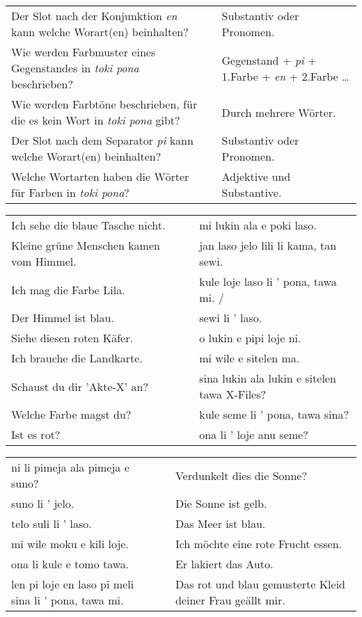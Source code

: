 \begin{supertabular}{p{5,5cm}|ll}
Der Slot nach der Konjunktion \textit{en} kann welche Worart(en) beinhalten? && Substantiv oder Pronomen.  \\ %
Wie werden Farbmuster eines Gegenstandes in \textit{toki pona} beschrieben? && Gegenstand + \textit{pi} + 1.Farbe + \textit{en} + 2.Farbe \dots \\ %
Wie werden Farbtöne beschrieben, für die es kein Wort in \textit{toki pona} gibt? && Durch mehrere Wörter. \\ %
Der Slot nach dem Separator \textit{pi} kann welche Worart(en) beinhalten? && Substantiv oder Pronomen.  \\ %
Welche Wortarten haben die Wörter für Farben in \textit{toki pona}? && Adjektive und Substantive. \\ %
\end{supertabular}

\begin{supertabular}{p{5,5cm}|ll}
Ich sehe die blaue Tasche nicht.  && mi lukin ala e poki laso. \\ %
Kleine grüne Menschen kamen vom Himmel.  && jan laso jelo lili li kama, tan sewi.  \\ %
Ich mag die Farbe Lila.  && kule loje laso li ' pona, tawa mi. / \\ %
Der Himmel ist blau.  && sewi li ' laso. \\ %
Siehe diesen roten Käfer.  && o lukin e pipi loje ni.  \\ %
Ich brauche die Landkarte.  && mi wile e sitelen ma. \\ %
Schaust du dir 'Akte-X' an?   && sina lukin ala lukin e sitelen tawa X-Files? \\ %
Welche Farbe magst du?  && kule seme li ' pona, tawa sina? \\ %
Ist es rot? && ona li ' loje anu seme? \\ %
\end{supertabular}  

\begin{supertabular}{p{5,5cm}|ll}
ni li pimeja ala pimeja e suno? && Verdunkelt dies die Sonne? \\
suno li ' jelo.  && Die Sonne ist gelb. \\
telo suli li ' laso.  && Das Meer ist blau. \\
mi wile moku e kili loje.  && Ich möchte eine rote Frucht essen. \\
ona li kule e tomo tawa.  && Er lakiert das Auto. \\
len pi loje en laso pi meli sina li ' pona, tawa mi. && Das rot und blau gemusterte Kleid deiner Frau geällt mir. \\
\end{supertabular}  

